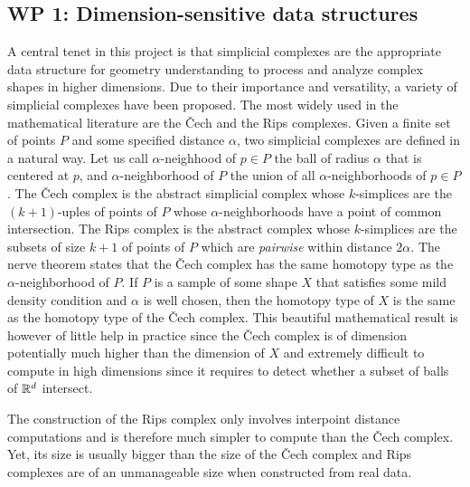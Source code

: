 \subsection*{WP 1:  Dimension-sensitive data structures} 

A central tenet in this project is that simplicial complexes are the appropriate data structure for geometry understanding
to process and analyze complex shapes in higher dimensions. %
Due to their importance and versatility, a variety of simplicial complexes have been proposed.
The most widely used in the mathematical literature are the \v{C}ech and the Rips complexes.
 Given a finite set of points $P$ and some specified distance $\alpha$, two simplicial complexes are defined in a natural way. Let us call $\alpha$-neighhood of $p\in P$ the ball of radius $\alpha$ that is centered at $p$, and $\alpha$-neighborhood of $P$ the union of all $\alpha$-neighborhoods of $p\in P$.  The \v{C}ech complex is the abstract simplicial complex whose $k$-simplices are the $(k+1)$-uples of points of $P$ whose $\alpha$-neighborhoods have a point of common intersection.  The Rips complex is the abstract complex whose $k$-simplices are the subsets of size $k+1$ of points of $P$ which are {\em pairwise} within distance $2\alpha$. The nerve theorem states that the \v{C}ech complex has the same homotopy type as the $\alpha$-neighborhood of $P$. If $P$ is a sample of some shape $X$ that satisfies some mild density condition and $\alpha$ is well chosen, then the homotopy type of $X$ is the same as the homotopy type of the \v{C}ech complex. 
 This beautiful mathematical result is however of little help in practice since the \v{C}ech complex is of dimension potentially much higher than the dimension of $X$ and extremely difficult to compute in high dimensions since it requires to detect whether a subset of balls of $\mathbb R ^d$ intersect. 

The construction of the Rips complex only involves interpoint distance computations and is therefore much  simpler to compute than the \v{C}ech complex. Yet, its size is usually bigger than the size of the \v{C}ech complex and Rips complexes are of an unmanageable size when constructed from real data. 

